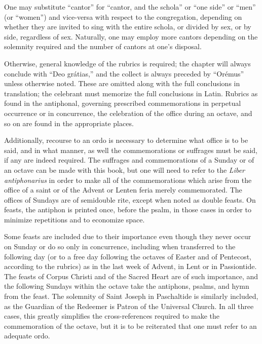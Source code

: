 \begin{enpars}
One may substitute ``cantor'' for ``cantor, and the schola'' or ``one side'' or ``men'' (or ``women'') and vice-versa with respect to the congregation, depending on whether they are invited to sing with the entire schola, or divided by sex, or by side, regardless of sex. Naturally, one may employ more cantors depending on the solemnity required and the number of cantors at one's disposal.

Otherwise, general knowledge of the rubrics is required; the chapter will always conclude with ``Deo grátias,'' and the collect is always preceded by ``Orémus'' unless otherwise noted. These are omitted along with the full conclusions in translation; the celebrant must memorize the full conclusions in Latin. Rubrics as found in the antiphonal, governing prescribed commemorations in perpetual occurrence or in concurrence, the celebration of the office during an octave, and so on are found in the appropriate places.

Additionally, recourse to an ordo is necessary to determine what office is to be said, and in what manner, as well the commemorations or suffrages must be said, if any are indeed required. The suffrages and commemorations of a Sunday or of an octave  can be made with this book, but one will need to refer to the \textit{Liber antiphonarius} in order to make all of the commemorations which arise from the office of a saint or of the Advent or Lenten feria merely commemorated. The offices of Sundays are of semidouble rite, except when noted as double feasts. On feasts, the antiphon is printed once, before the psalm, in those cases in order to minimize repetitions and to economize space.

Some feasts are included due to their importance even though they never occur on Sunday or do so only in concurrence, including when transferred to the following day (or to a free day following the octaves of Easter and of Pentecost, according to the rubrics) as in the last week of Advent, in Lent or in Passiontide. The feasts of Corpus Christi and of the Sacred Heart are of such importance, and the following Sundays within the octave take the antiphons, psalms, and hymn from the feast. The solemnity of Saint Joseph in Paschaltide is similarly included, as the Guardian of the Redeemer is Patron of the Universal Church. In all three cases, this greatly simplifies the cross-references required to make the commemoration of the octave, but it is to be reiterated that one must refer to an adequate ordo.


\end{enpars}
